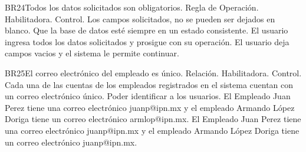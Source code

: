 \begin{BussinesRule}{BR24}{Todos los datos solicitados son obligatorios.}
    \BRitem[Tipo:] Regla de Operación.
    \BRitem[Clase:] Habilitadora.
    \BRitem[Nivel:] Control.
    \BRitem[Descripción:] Los campos solicitados, no se pueden ser dejados en blanco.
    \BRitem[Sentencia:]
    \BRitem[Motivación: ]Que la base de datos esté siempre en un estado consistente.
     El usuario ingresa todos los datos solicitados y prosigue con su operación.
    El usuario deja campos vacios y el sistema le permite continuar.
\end{BussinesRule}
\begin{BussinesRule}{BR25}{El correo electrónico del empleado es único.}
    \BRitem[Tipo: ]Relación.
    \BRitem[Clase: ]Habilitadora.
    \BRitem[Nivel: ]Control.
    \BRitem[Descripción:] Cada una de las cuentas de los empleados registrados en el sistema cuentan con un correo electrónico único.
    \BRitem[Motivación: ]Poder identificar a los usuarios.
     El Empleado Juan Perez tiene una correo electrónico juanp@ipn.mx  y el empleado Armando López Doriga tiene un correo electrónico armlop@ipn.mx.
     El Empleado Juan Perez tiene una correo electrónico juanp@ipn.mx  y el empleado Armando López Doriga tiene un correo electrónico juanp@ipn.mx.
\end{BussinesRule}


